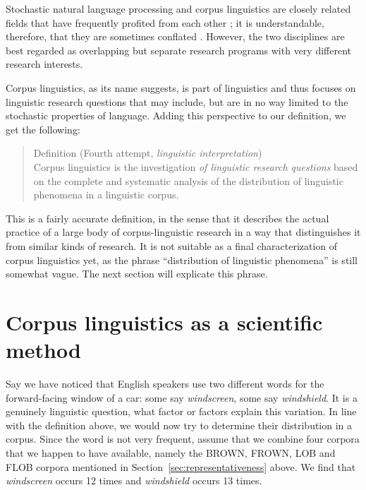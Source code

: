 Stochastic natural language processing and corpus linguistics are closely related fields that have frequently profited from each other \citep[see, e.g.,][5]{kennedy_introduction_1998}; it is understandable, therefore, that they are sometimes conflated \citep[see, e.g.,][769]{sebba_corpora_1994}. However, the two disciplines are best regarded as overlapping but separate research programs with very different research interests.

Corpus linguistics, as its name suggests, is part of linguistics and thus focuses on linguistic research questions that may include, but are in no way limited to the stochastic properties of language. Adding this perspective to our definition, we get the following:

\begin{quotation}
Definition (Fourth attempt, \emph{linguistic interpretation}) \\
Corpus linguistics is the investigation \emph{of linguistic research questions} based on the complete and systematic analysis of the distribution  of linguistic phenomena in a linguistic corpus.
\end{quotation}

This is a fairly accurate definition, in the sense that it describes the actual practice of a large body of corpus\hyp{}linguistic research in a way that distinguishes it from similar kinds of research. It is not suitable as a final characterization of corpus linguistics yet, as the phrase ``distribution  of linguistic phenomena'' is still somewhat vague. The next section will explicate this phrase.


\section{Corpus linguistics as a scientific method}
\label{sec:corpusscientific}

Say we have noticed that English speakers use two different words for the forward\hyp{}facing window of a car: some say \textit{windscreen}, some say \textit{windshield}. It is a genuinely linguistic question, what factor or factors explain  this variation.  In line with the definition above, we would now try to determine their distribution  in a corpus. Since the word is not very frequent,  assume that we combine four corpora that we happen to have available, namely the BROWN,  FROWN,  LOB  and FLOB  corpora mentioned in Section~\ref{sec:representativeness} above. We find that \textit{windscreen} occurs 12 times and \textit{windshield} occurs 13 times.

